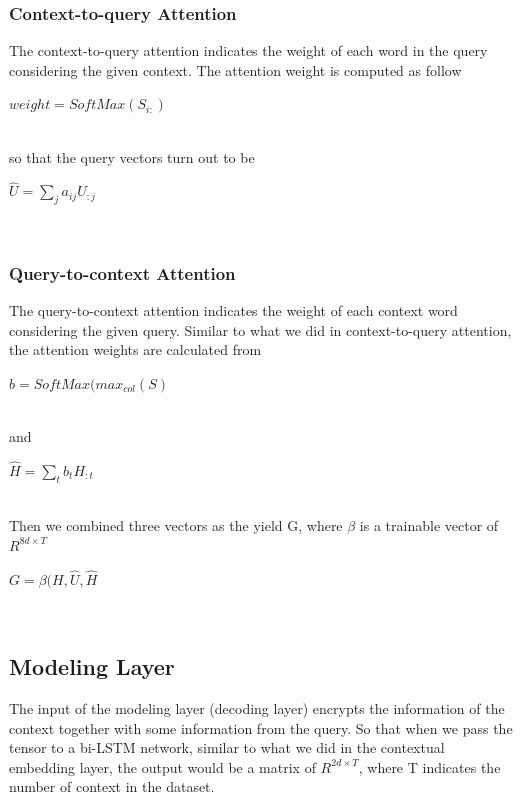 \documentclass{article} %
\begin{document}
\subsubsection{Context-to-query Attention}

The context-to-query attention indicates the weight of each word in the query considering the given context. The attention weight is computed as follow\\
\newline
\centerline{$weight=SoftMax(S_{i:})$}\\
\newline
so that the query vectors turn out to be\\
\newline
\centerline{$\hat{U}=\sum_j a_{ij}U_{:j}$}\\

\subsubsection{Query-to-context Attention}

The query-to-context attention indicates the weight of each context word considering the given query. Similar to what we did in context-to-query attention, the attention weights are calculated from\\
\newline
\centerline{$b=SoftMax(max_{col}(S)$}\\
\newline
and
\newline
\centerline{$\hat{H}=\sum_tb_tH_{:t}$}\\
\newline
Then we combined three vectors as the yield G, where $\beta$ is a trainable vector of $R^{8d\times T}$\\
\newline
\centerline{$G=\beta (H, \hat{U}, \hat{H}$}\\

\subsection{Modeling Layer}

The input of the modeling layer (decoding layer) encrypts the information of the context together with some information from the query. So that when we pass the tensor to a bi-LSTM network, similar to what we did in the contextual embedding layer, the output would be a matrix of $R^{2d\times T}$, where T indicates the number of context in the dataset.
\end{document}
